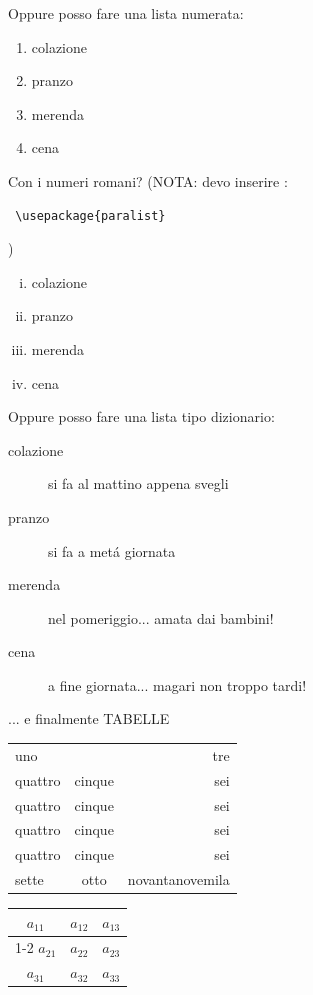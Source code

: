 \documentclass[12pt]{article}
\begin{document}
Oppure posso fare una lista numerata: 

\begin{enumerate}
\item colazione
\item pranzo
\item merenda
\item cena
\end{enumerate}
 
Con i numeri romani? (NOTA: devo inserire :
\begin{verbatim}
 \usepackage{paralist}
\end{verbatim})


\begin{enumerate}[(i)]
\item colazione
\item pranzo
\item merenda
\item cena
\end{enumerate}

Oppure posso fare una lista tipo dizionario:
\begin{description}
\item[colazione] si fa al mattino appena svegli
\item [pranzo] si fa a met\'a giornata
\item [merenda] nel pomeriggio... amata dai bambini!
\item [cena] a fine giornata... magari non troppo tardi!
\end{description}
\newpage
{\LARGE ... e finalmente TABELLE}

\bigskip\bigskip

\begin{tabular}{lcr}
uno &  & tre \\
quattro & cinque & sei \\
quattro & cinque & sei \\
quattro & cinque & sei \\
quattro & cinque & sei \\
sette & otto & novantanovemila
\end{tabular}
\bigskip\bigskip


\begin{tabular}{|c|c|c|}
  \hline
  $a_{11}$ &  $a_{12}$ &  $a_{13}$ \\
  \cline{1-2}
   $a_{21}$ &  $a_{22}$ &  $a_{23}$ \\
\hline
   $a_{31}$ &  $a_{32}$ &  $a_{33}$ \\
  \hline
\end{tabular}
\end{document}
